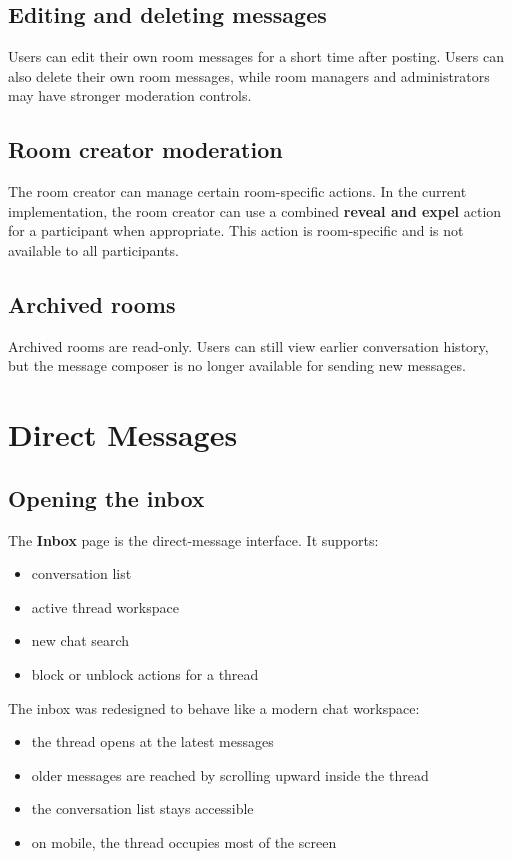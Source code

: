 \documentclass[11pt,a4paper]{article}
\begin{document}
\subsection{Editing and deleting messages}

Users can edit their own room messages for a short time after posting. Users can also delete their own room messages, while room managers and administrators may have stronger moderation controls.

\subsection{Room creator moderation}

The room creator can manage certain room-specific actions. In the current implementation, the room creator can use a combined \textbf{reveal and expel} action for a participant when appropriate. This action is room-specific and is not available to all participants.

\subsection{Archived rooms}

Archived rooms are read-only. Users can still view earlier conversation history, but the message composer is no longer available for sending new messages.

\section{Direct Messages}

\subsection{Opening the inbox}

The \textbf{Inbox} page is the direct-message interface. It supports:

\begin{itemize}[leftmargin=1.5em]
  \item conversation list
  \item active thread workspace
  \item new chat search
  \item block or unblock actions for a thread
\end{itemize}

The inbox was redesigned to behave like a modern chat workspace:

\begin{itemize}[leftmargin=1.5em]
  \item the thread opens at the latest messages
  \item older messages are reached by scrolling upward inside the thread
  \item the conversation list stays accessible
  \item on mobile, the thread occupies most of the screen
\end{itemize}
\end{document}
